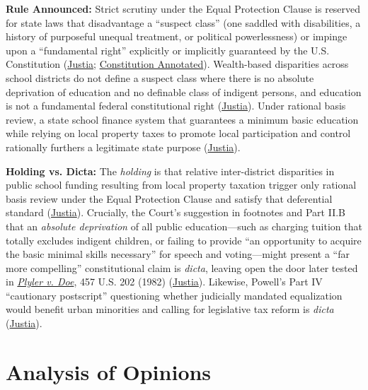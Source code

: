 \documentclass[12pt]{article}
\begin{document}
\textbf{Rule Announced:} Strict scrutiny under the Equal Protection Clause is reserved for state laws that disadvantage a ``suspect class'' (one saddled with disabilities, a history of purposeful unequal treatment, or political powerlessness) or impinge upon a ``fundamental right'' explicitly or implicitly guaranteed by the U.S. Constitution (\href{https://supreme.justia.com/cases/federal/us/411/1/}{Justia}; \href{https://www.law.cornell.edu/constitution-conan/amendment-14/section-1/educational-opportunity}{Constitution Annotated}). Wealth-based disparities across school districts do not define a suspect class where there is no absolute deprivation of education and no definable class of indigent persons, and education is not a fundamental federal constitutional right (\href{https://supreme.justia.com/cases/federal/us/411/1/}{Justia}). Under rational basis review, a state school finance system that guarantees a minimum basic education while relying on local property taxes to promote local participation and control rationally furthers a legitimate state purpose (\href{https://supreme.justia.com/cases/federal/us/411/1/}{Justia}).

\textbf{Holding vs. Dicta:} The \emph{holding} is that relative inter-district disparities in public school funding resulting from local property taxation trigger only rational basis review under the Equal Protection Clause and satisfy that deferential standard (\href{https://supreme.justia.com/cases/federal/us/411/1/}{Justia}). Crucially, the Court's suggestion in footnotes and Part II.B that an \emph{absolute deprivation} of all public education---such as charging tuition that totally excludes indigent children, or failing to provide ``an opportunity to acquire the basic minimal skills necessary'' for speech and voting---might present a ``far more compelling'' constitutional claim is \emph{dicta}, leaving open the door later tested in \href{https://www.law.cornell.edu/supremecourt/text/457/202}{\textit{Plyler v. Doe}}, 457 U.S. 202 (1982) (\href{https://supreme.justia.com/cases/federal/us/411/1/}{Justia}). Likewise, Powell's Part IV ``cautionary postscript'' questioning whether judicially mandated equalization would benefit urban minorities and calling for legislative tax reform is \emph{dicta} (\href{https://supreme.justia.com/cases/federal/us/411/1/}{Justia}).

\section{Analysis of Opinions}
\end{document}
